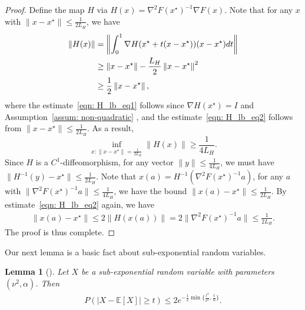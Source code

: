 \documentclass[11pt,twoside]{article}
\numberwithin{equation}{section}
\newcommand{\norm}[1] {\left \| #1 \right \|}
\newcommand{\EE}{\mathbb{E}}
\newcommand{\1}{\mathbf{1}}
\newtheorem{lemma}[theorem]{Lemma}
\theoremstyle{remark}
\theoremstyle{plain}
\newcommand{\liph}{L_H}
\begin{document}
\begin{proof}
	Define the map $H$ via $H(x) = \nabla^2 F(x^\star)^{-1} \nabla F(x)$. Note that for any $x$ with $\|x -x^\star\|\le \frac{1}{2\liph}$, we have
	\begin{align}
		\|H(x)\|&= \norm{\int_{0}^{1}\nabla H(x^\star + t(x-x^\star))(x-x^\star) dt } \notag\\
		&\ge  \norm{x- x^\star}- \frac{\liph}{2}\norm{x-x^\star}^2\label{eqn: H_lb_eq1}\\
		&\ge \frac{1}{2} \norm{x-x^\star} \label{eqn: H_lb_eq2},
	\end{align}
	where the estimate~\eqref{eqn: H_lb_eq1} follows since $\nabla H(x^\star) = I$ and Assumption~\ref{assum: non-quadratic} , and the estimate~\eqref{eqn: H_lb_eq2} follows from $\|x-x^\star\| \le \frac{1}{2\liph}$. As a result,
	$$
	\inf_{x \colon \|x-x^\star\| = \frac{1}{2\liph}} \|H(x)\| \ge \frac{1}{4\liph}.
	$$
	Since $H$ is a $C^1$-diffeomorphism, for any vector $\|y\| \le \frac{1}{4\liph}$, we must have $\|H^{-1}(y) - x^\star\| \le \frac{1}{2\liph}$. Note that $x(a) = H^{-1}(\nabla^2 F(x^\star)^{-1} a)$, for any $a$ with $\|\nabla^2 F(x^\star)^{-1} a\| \le \frac{1}{4\liph}$, we have the bound $\|x(a) - x^\star\|\le \frac{1}{2\liph}$. By estimate~\eqref{eqn: H_lb_eq2} again,  we have
	\begin{align*}
		\norm{x(a) - x^\star} \le 2 \|H(x(a))\| = 2\| \nabla^2 F(x^\star)^{-1} a\| \le \frac{1}{2\liph}.
	\end{align*}
	The proof is thus complete.
\end{proof}

Our next lemma is a basic fact about sub-exponential random variables.
\begin{lemma}[{\cite[Proposition 2.9]{wainwright2019high}}]\label{lem:subexp_tail}
	Let $X$ be a sub-exponential random variable with parameters $(\nu^2, \alpha)$. Then
	\begin{align*}
		P(|X - \EE[X]| \ge t) \le 2e^{-\frac{1}{2} \min\{\frac{t^2}{\nu^2}, \frac{t}{\alpha}\}}.
	\end{align*}
\end{lemma}
\end{document}
